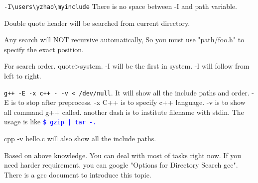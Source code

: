 \documentclass[paper=8.5in:11in, twoside, 12pt, pagesize=pdftex]{book}
\newcommand{\linuxcommand}[1]{\texttt{\textcolor{blue}{\$ #1 \Pisymbol{psy}{191}}}}
\begin{document}
	\verb=-I\users\yzhao\myinclude= There is no space between -I and path variable. 

	Double quote header will be searched from current directory. 

	Any search will NOT recursive automatically, So you must use "path/foo.h" to specify the exact position. 

	For search order. quote>system. -I will be the first in system. -I will follow from left to right.

	\verb=g++ -E -x c++ - -v < /dev/null=. It will show all the include paths and order. -E is to stop after preprocess. -x C++ is to specify c++ language. -v is to show all command g++ called. another dash is to institute filename with stdin. The usage is like \linuxcommand{gzip | tar -. } 

	cpp -v hello.c will also show all the include paths. 

	Based on above knowledge. You can deal with most of tasks right now. If you need harder requirement. you can google "Options for Directory Search gcc". There is a gcc document to introduce this topic.  
		
\end{document}
